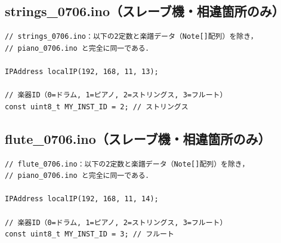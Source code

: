 \subsection{strings\_0706.ino（スレーブ機・相違箇所のみ）}
\begin{lstlisting}[caption={strings\_0706.ino（piano\_0706.inoとの相違箇所のみ）}, label={lst:douki_strings_full}]
// strings_0706.ino：以下の2定数と楽譜データ（Note[]配列）を除き，
// piano_0706.ino と完全に同一である．

IPAddress localIP(192, 168, 11, 13);

// 楽器ID（0=ドラム, 1=ピアノ, 2=ストリングス, 3=フルート）
const uint8_t MY_INST_ID = 2; // ストリングス
\end{lstlisting}

\subsection{flute\_0706.ino（スレーブ機・相違箇所のみ）}
\begin{lstlisting}[caption={flute\_0706.ino（piano\_0706.inoとの相違箇所のみ）}, label={lst:douki_flute_full}]
// flute_0706.ino：以下の2定数と楽譜データ（Note[]配列）を除き，
// piano_0706.ino と完全に同一である．

IPAddress localIP(192, 168, 11, 14);

// 楽器ID（0=ドラム, 1=ピアノ, 2=ストリングス, 3=フルート）
const uint8_t MY_INST_ID = 3; // フルート
\end{lstlisting}
